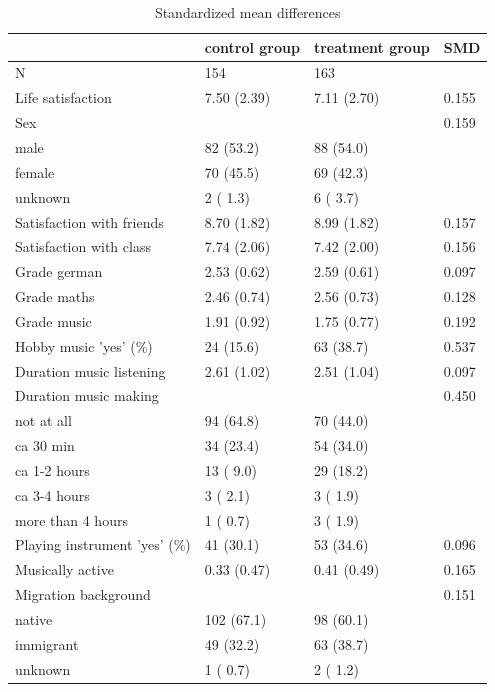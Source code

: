 \documentclass[a4, 12pt]{article}
\begin{document}
\begin{table}[H]

\caption{\label{tab:smdtab}Standardized mean differences}
\centering
\begin{tabu} to 
\toprule
  & control group & treatment group & SMD\\
\midrule
N & 154 & 163 & \\
Life satisfaction & 7.50 (2.39) & 7.11 (2.70) & 0.155\\
Sex &  &  & 0.159\\
male & 82 (53.2) & 88 (54.0) & \\
female & 70 (45.5) & 69 (42.3) & \\
\addlinespace
unknown & 2 ( 1.3) & 6 ( 3.7) & \\
Satisfaction with friends & 8.70 (1.82) & 8.99 (1.82) & 0.157\\
Satisfaction with class & 7.74 (2.06) & 7.42 (2.00) & 0.156\\
Grade german & 2.53 (0.62) & 2.59 (0.61) & 0.097\\
Grade maths & 2.46 (0.74) & 2.56 (0.73) & 0.128\\
\addlinespace
Grade music & 1.91 (0.92) & 1.75 (0.77) & 0.192\\
Hobby music 'yes' (\%) & 24 (15.6) & 63 (38.7) & 0.537\\
Duration music listening & 2.61 (1.02) & 2.51 (1.04) & 0.097\\
Duration music making &  &  & 0.450\\
not at all & 94 (64.8) & 70 (44.0) & \\
\addlinespace
ca 30 min & 34 (23.4) & 54 (34.0) & \\
ca 1-2 hours & 13 ( 9.0) & 29 (18.2) & \\
ca 3-4 hours & 3 ( 2.1) & 3 ( 1.9) & \\
more than 4 hours & 1 ( 0.7) & 3 ( 1.9) & \\
Playing instrument 'yes' (\%) & 41 (30.1) & 53 (34.6) & 0.096\\
\addlinespace
Musically active & 0.33 (0.47) & 0.41 (0.49) & 0.165\\
Migration background &  &  & 0.151\\
native & 102 (67.1) & 98 (60.1) & \\
immigrant & 49 (32.2) & 63 (38.7) & \\
unknown & 1 ( 0.7) & 2 ( 1.2) & \\
\bottomrule
\end{tabu}
\end{table}
\end{document}
